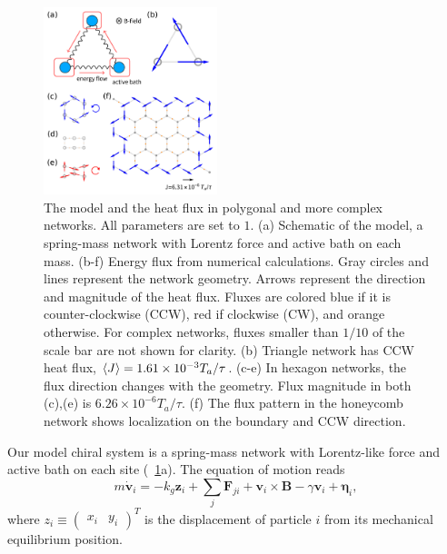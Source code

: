 \documentclass[
 preprint,
 preprintnumbers,
 amsmath,amssymb,
 aps,
 pre,
 longbibliography,
 superscriptaddress,
 10pt, twocolumn
]{revtex4-1}
\begin{document}
\begin{figure}[ht]
	\centering
	\includegraphics[width=0.45\textwidth]{1_model_and_result.pdf}
    \caption{The model and the heat flux in polygonal and more complex networks. All parameters are set to $1$.
    (a) Schematic of the model, a spring-mass network with Lorentz force and active bath on each mass.
    (b-f) Energy flux from numerical calculations. Gray circles and lines represent the network geometry. Arrows represent the direction and magnitude of the heat flux. Fluxes are colored blue if it is counter-clockwise (CCW), red if clockwise (CW), and orange otherwise. For complex networks, fluxes smaller than $1/10$ of the scale bar are not shown for clarity.
    (b) Triangle network has CCW heat flux, $\expval{J}=1.61\times 10^{-3} T_a/\tau$.
    (c-e) In hexagon networks, the flux direction changes with the geometry. Flux magnitude in both (c),(e) is $6.26\times 10^{-6} T_a/\tau$.
    (f) The flux pattern in the honeycomb network shows localization on the boundary and CCW direction.
    }
    \label{fig:model_and_result}
\end{figure}

Our model chiral system is a spring-mass network with Lorentz-like force and active bath \cite{Fodor2016HowFar} on each site (\figurename~\ref{fig:model_and_result}a).
The equation of motion reads
\begin{equation} \label{eqn:GLE_single}
    m\dot{\bm{v}}_i = -k_g \bm{z}_i + \sum_j\bm{F}_{ji} + \bm{v}_i\times\bm{B} - \gamma\bm{v}_i + \bm{\eta}_i ,
\end{equation}
where $z_i \equiv \begin{pmatrix} x_i & y_i \end{pmatrix}^T$ is the displacement of particle $i$ from its mechanical equilibrium position.
\end{document}
